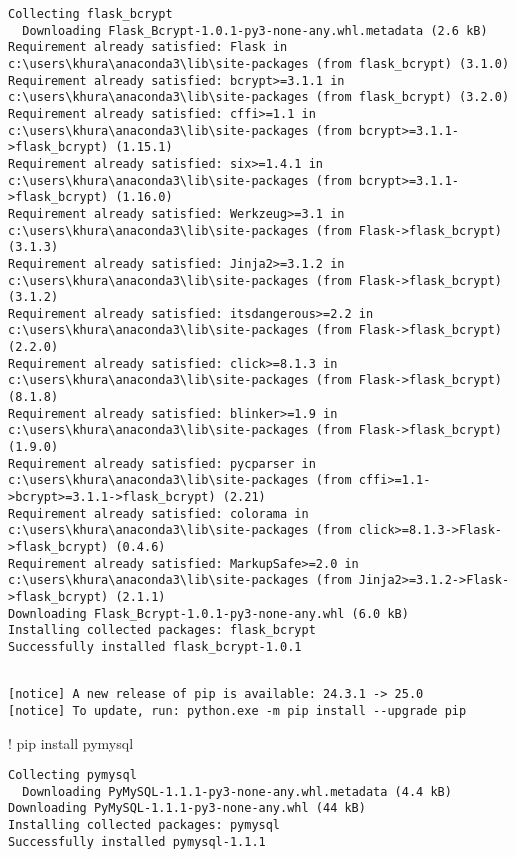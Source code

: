 \documentclass[
  letterpaper,
  DIV=11,
  numbers=noendperiod]{scrreprt}
\newenvironment{Shaded}{\begin{snugshade}}{\end{snugshade}}
\newcommand{\NormalTok}[1]{\textcolor[rgb]{0.00,0.23,0.31}{#1}}
\newcommand{\OperatorTok}[1]{\textcolor[rgb]{0.37,0.37,0.37}{#1}}
\begin{document}
\begin{verbatim}
Collecting flask_bcrypt
  Downloading Flask_Bcrypt-1.0.1-py3-none-any.whl.metadata (2.6 kB)
Requirement already satisfied: Flask in c:\users\khura\anaconda3\lib\site-packages (from flask_bcrypt) (3.1.0)
Requirement already satisfied: bcrypt>=3.1.1 in c:\users\khura\anaconda3\lib\site-packages (from flask_bcrypt) (3.2.0)
Requirement already satisfied: cffi>=1.1 in c:\users\khura\anaconda3\lib\site-packages (from bcrypt>=3.1.1->flask_bcrypt) (1.15.1)
Requirement already satisfied: six>=1.4.1 in c:\users\khura\anaconda3\lib\site-packages (from bcrypt>=3.1.1->flask_bcrypt) (1.16.0)
Requirement already satisfied: Werkzeug>=3.1 in c:\users\khura\anaconda3\lib\site-packages (from Flask->flask_bcrypt) (3.1.3)
Requirement already satisfied: Jinja2>=3.1.2 in c:\users\khura\anaconda3\lib\site-packages (from Flask->flask_bcrypt) (3.1.2)
Requirement already satisfied: itsdangerous>=2.2 in c:\users\khura\anaconda3\lib\site-packages (from Flask->flask_bcrypt) (2.2.0)
Requirement already satisfied: click>=8.1.3 in c:\users\khura\anaconda3\lib\site-packages (from Flask->flask_bcrypt) (8.1.8)
Requirement already satisfied: blinker>=1.9 in c:\users\khura\anaconda3\lib\site-packages (from Flask->flask_bcrypt) (1.9.0)
Requirement already satisfied: pycparser in c:\users\khura\anaconda3\lib\site-packages (from cffi>=1.1->bcrypt>=3.1.1->flask_bcrypt) (2.21)
Requirement already satisfied: colorama in c:\users\khura\anaconda3\lib\site-packages (from click>=8.1.3->Flask->flask_bcrypt) (0.4.6)
Requirement already satisfied: MarkupSafe>=2.0 in c:\users\khura\anaconda3\lib\site-packages (from Jinja2>=3.1.2->Flask->flask_bcrypt) (2.1.1)
Downloading Flask_Bcrypt-1.0.1-py3-none-any.whl (6.0 kB)
Installing collected packages: flask_bcrypt
Successfully installed flask_bcrypt-1.0.1
\end{verbatim}

\begin{verbatim}

[notice] A new release of pip is available: 24.3.1 -> 25.0
[notice] To update, run: python.exe -m pip install --upgrade pip
\end{verbatim}

\begin{Shaded}
\begin{Highlighting}[]
\OperatorTok{!}\NormalTok{ pip install pymysql}
\end{Highlighting}
\end{Shaded}

\begin{verbatim}
Collecting pymysql
  Downloading PyMySQL-1.1.1-py3-none-any.whl.metadata (4.4 kB)
Downloading PyMySQL-1.1.1-py3-none-any.whl (44 kB)
Installing collected packages: pymysql
Successfully installed pymysql-1.1.1
\end{verbatim}
\end{document}
